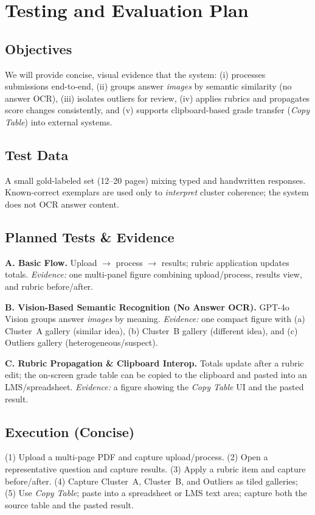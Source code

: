 \documentclass[ms,twoside,print]{nuthesis}
\begin{document}
\chapter{Testing and Evaluation Plan}\label{chap:evalplan}

\section{Objectives}
We will provide concise, visual evidence that the system:
(i) processes submissions end-to-end,
(ii) groups answer \emph{images} by semantic similarity (no answer OCR),
(iii) isolates outliers for review,
(iv) applies rubrics and propagates score changes consistently, and
(v) supports clipboard-based grade transfer (\emph{Copy Table}) into external systems.

\section{Test Data}
A small gold-labeled set (12–20 pages) mixing typed and handwritten responses.
Known-correct exemplars are used only to \emph{interpret} cluster coherence; the system does not OCR answer content.

\section{Planned Tests \& Evidence}
\textbf{A. Basic Flow.} Upload \(\rightarrow\) process \(\rightarrow\) results; rubric application updates totals.  
\emph{Evidence:} one multi-panel figure combining upload/process, results view, and rubric before/after.

\textbf{B. Vision-Based Semantic Recognition (No Answer OCR).}
GPT-4o Vision groups answer \emph{images} by meaning.  
\emph{Evidence:} one compact figure with (a) Cluster~A gallery (similar idea), (b) Cluster~B gallery (different idea), and (c) Outliers gallery (heterogeneous/suspect).

\textbf{C. Rubric Propagation \& Clipboard Interop.}
Totals update after a rubric edit; the on-screen grade table can be copied to the clipboard and pasted into an LMS/spreadsheet.  
\emph{Evidence:} a figure showing the \emph{Copy Table} UI and the pasted result.

\section{Execution (Concise)}
(1) Upload a multi-page PDF and capture upload/process. 
(2) Open a representative question and capture results.
(3) Apply a rubric item and capture before/after.
(4) Capture Cluster~A, Cluster~B, and Outliers as tiled galleries;
(5) Use \emph{Copy Table}; paste into a spreadsheet or LMS text area; capture both the source table and the pasted result.
\end{document}
